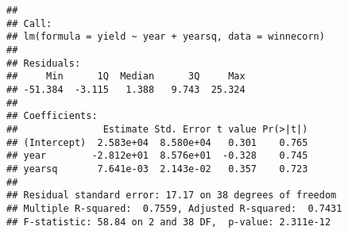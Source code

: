 \documentclass[
]{book}
\newenvironment{Shaded}{\begin{snugshade}}{\end{snugshade}}
\newcommand{\AttributeTok}[1]{\textcolor[rgb]{0.77,0.63,0.00}{#1}}
\newcommand{\CommentTok}[1]{\textcolor[rgb]{0.56,0.35,0.01}{\textit{#1}}}
\newcommand{\DecValTok}[1]{\textcolor[rgb]{0.00,0.00,0.81}{#1}}
\newcommand{\FunctionTok}[1]{\textcolor[rgb]{0.00,0.00,0.00}{#1}}
\newcommand{\NormalTok}[1]{#1}
\newcommand{\OtherTok}[1]{\textcolor[rgb]{0.56,0.35,0.01}{#1}}
\newcommand{\SpecialCharTok}[1]{\textcolor[rgb]{0.00,0.00,0.00}{#1}}
\newcommand{\StringTok}[1]{\textcolor[rgb]{0.31,0.60,0.02}{#1}}
\begin{document}
\begin{Shaded}
\end{Shaded}

\begin{verbatim}
## 
## Call:
## lm(formula = yield ~ year + yearsq, data = winnecorn)
## 
## Residuals:
##     Min      1Q  Median      3Q     Max 
## -51.384  -3.115   1.388   9.743  25.324 
## 
## Coefficients:
##               Estimate Std. Error t value Pr(>|t|)
## (Intercept)  2.583e+04  8.580e+04   0.301    0.765
## year        -2.812e+01  8.576e+01  -0.328    0.745
## yearsq       7.641e-03  2.143e-02   0.357    0.723
## 
## Residual standard error: 17.17 on 38 degrees of freedom
## Multiple R-squared:  0.7559, Adjusted R-squared:  0.7431 
## F-statistic: 58.84 on 2 and 38 DF,  p-value: 2.311e-12
\end{verbatim}

\begin{Shaded}
\end{Shaded}
\end{document}
